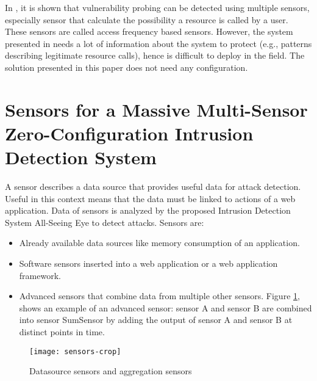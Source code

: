 \documentclass[conference]{IEEEtran}
\begin{document}
In \cite{kruegel_multi-model_2005}, it is shown that vulnerability probing can be detected using multiple sensors, especially sensor that calculate the possibility a resource is called by a user. These sensors are called access frequency based sensors. However, the system presented in \cite{kruegel_multi-model_2005} needs a lot of information about the system to protect (e.g., patterns describing legitimate resource calls), hence is difficult to deploy in the field. The solution presented in this paper does not need any configuration.

\section{Sensors for a Massive Multi-Sensor Zero-Configuration Intrusion Detection System}\label{sensors}
A sensor describes a data source that provides useful data for attack detection. Useful in this context means that the data must be linked to actions of a web application. Data of sensors is analyzed by the proposed Intrusion Detection System All-Seeing Eye to detect attacks. Sensors are:
\begin{itemize}
\item Already available data sources like memory consumption of an application.
\item Software sensors inserted into a web application or a web application framework.
\item Advanced sensors that combine data from multiple other sensors. Figure \ref{figure:sensors}, shows an example of an advanced sensor: sensor A and sensor B are combined into sensor SumSensor by adding the output of sensor A and sensor B at distinct points in time.
\end{itemize}

\begin{figure}
 \centering
\texttt{[image: sensors-crop]}
  
  \caption{Datasource sensors and aggregation sensors}\label{figure:sensors}
\end{figure}
\end{document}
